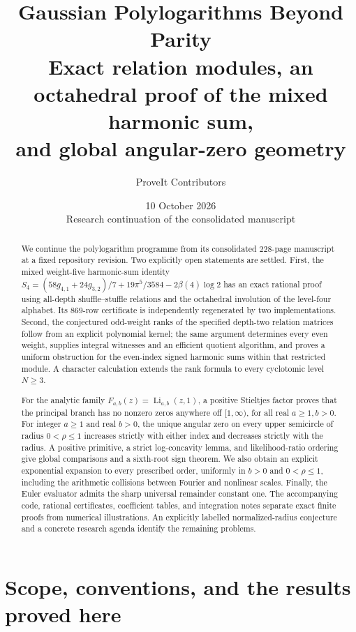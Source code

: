 \documentclass[11pt]{article}
\title{\textbf{Gaussian Polylogarithms Beyond Parity}\\[5pt]
\Large Exact relation modules, an octahedral proof of the mixed harmonic sum,\\
and global angular-zero geometry}
\author{ProveIt Contributors}
\date{10 October 2026\\\small Research continuation of the consolidated manuscript}
\numberwithin{equation}{section}
\theoremstyle{plain}
\theoremstyle{definition}
\theoremstyle{remark}
\DeclareMathOperator{\Li}{Li}
\begin{document}
\maketitle
\thispagestyle{empty}
\begin{abstract}
We continue the polylogarithm programme from its consolidated 228-page
manuscript at a fixed repository revision. Two explicitly open statements
are settled. First, the mixed weight-five harmonic-sum identity
\(S_4=(58g_{4,1}+24g_{3,2})/7+19\pi^5/3584-2\beta(4)\log2\)
has an exact rational proof using all-depth shuffle--stuffle relations
and the octahedral involution of the level-four alphabet. Its 869-row
certificate is independently regenerated by two implementations.
Second, the conjectured odd-weight ranks of the specified depth-two
relation matrices follow from an explicit polynomial kernel; the same
argument determines every even weight, supplies integral witnesses and
an efficient quotient algorithm, and proves a uniform obstruction for
the even-index signed harmonic sums within that restricted module.
A character calculation extends the rank formula to every cyclotomic
level $N\ge3$.

For the analytic family \(F_{a,b}(z)=\Li_{a,b}(z,1)\), a positive
Stieltjes factor proves that the principal branch has no nonzero zeros
anywhere off $[1,\infty)$, for all real $a\ge1,b>0$.
For integer \(a\ge1\) and real \(b>0\), the unique angular zero on
every upper semicircle of radius \(0<\rho\le1\) increases strictly
with either index and decreases strictly with the radius. A positive
primitive, a strict log-concavity lemma, and likelihood-ratio ordering
give global comparisons and a sixth-root sign theorem. We also obtain
an explicit exponential expansion to every prescribed order, uniformly
in \(b>0\) and \(0<\rho\le1\), including the arithmetic collisions
between Fourier and nonlinear scales. Finally, the Euler evaluator
admits the sharp universal remainder constant one. The accompanying
code, rational certificates, coefficient tables, and integration notes
separate exact finite proofs from numerical illustrations. An explicitly
labelled normalized-radius conjecture and a concrete research agenda
identify the remaining problems.
\end{abstract}
\clearpage
\begingroup
\small
\tableofcontents
\endgroup
\clearpage

\section{Scope, conventions, and the results proved here}
\label{sec:scope}
\end{document}
